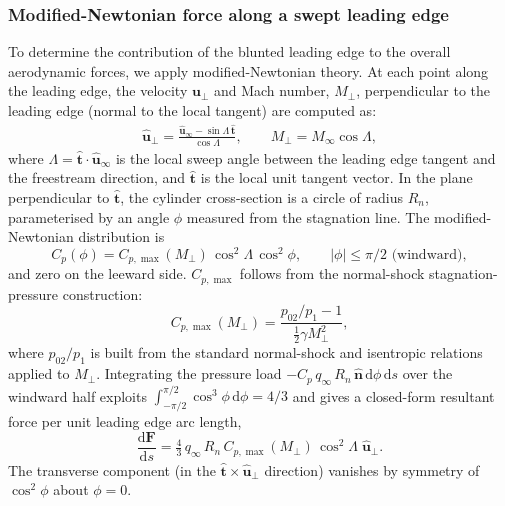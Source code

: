 \documentclass[10pt,a4paper]{article}
\begin{document}
\subsubsection{Modified-Newtonian force along a swept leading edge}\label{sec:LE_newton}
To determine the contribution of the blunted leading edge to the overall aerodynamic forces, we apply modified-Newtonian theory. At each point along the leading edge, the velocity  $\mathbf{u}_\perp$ and Mach number, $M_\perp$, perpendicular to the leading edge (normal to the local tangent) are computed as:
\begin{gather}
    \hat{\mathbf{u}}_\perp = \frac{\hat{\mathbf{u}}_\infty - \sin\Lambda\,\hat{\mathbf{t}}}{\cos\Lambda},\qquad
    M_\perp = M_\infty\cos\Lambda,
\end{gather}
where $\Lambda=\hat{\mathbf{t}}\!\cdot\!\hat{\mathbf{u}}_\infty$ is the local sweep angle between the leading edge tangent and the freestream direction, and $\hat{\mathbf{t}}$ is the local unit tangent vector. In the plane perpendicular to $\hat{\mathbf{t}}$, the cylinder cross-section is a circle of radius $R_n$, parameterised by an angle $\phi$ measured from the stagnation line.  The modified-Newtonian distribution is
\begin{equation}
    C_p(\phi) = C_{p,\max}(M_\perp)\,\cos^{2}\!\Lambda\,\cos^{2}\!\phi,
    \qquad |\phi| \le \pi/2 \text{ (windward)},
\end{equation}
and zero on the leeward side. $C_{p,\max}$ follows from the normal-shock stagnation-pressure construction:
\begin{equation}
    C_{p,\max}(M_\perp)
    = \frac{p_{02}/p_1 - 1}{\tfrac{1}{2}\gamma M_\perp^{2}},
    \label{eq:Cpmax}
\end{equation}
where $p_{02}/p_1$ is built from the standard normal-shock and isentropic relations applied to $M_\perp$. Integrating the pressure load $-C_p\,q_\infty\,R_n\,\hat{\mathbf{n}}\,\mathrm{d}\phi\,\mathrm{d}s$ over the windward half exploits $\int_{-\pi/2}^{\pi/2}\cos^{3}\phi\,\mathrm{d}\phi = 4/3$ and gives a closed-form resultant force per unit leading edge arc length,
\begin{equation}
    \frac{\mathrm{d}\mathbf{F}}{\mathrm{d}s}
    = \tfrac{4}{3}\,q_\infty\,R_n\,C_{p,\max}(M_\perp)\,\cos^{2}\!\Lambda\;\hat{\mathbf{u}}_\perp.
    \label{eq:LE_force}
\end{equation}
The transverse component (in the $\hat{\mathbf{t}}\!\times\!\hat{\mathbf{u}}_\perp$ direction) vanishes by symmetry of $\cos^{2}\!\phi$ about $\phi = 0$.
\end{document}
